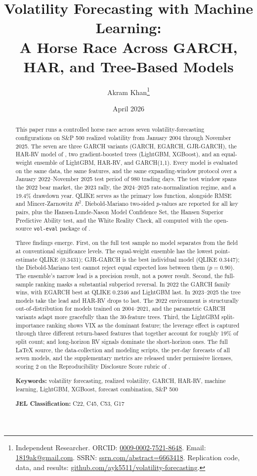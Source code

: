 \documentclass[12pt,a4paper]{article}
\title{Volatility Forecasting with Machine Learning:\\A Horse Race Across GARCH, HAR, and Tree-Based Models}
\author{
    Akram Khan\thanks{Independent Researcher. ORCID: \href{https://orcid.org/0009-0002-7521-8648}{0009-0002-7521-8648}. Email: \href{mailto:1819ak@gmail.com}{1819ak@gmail.com}. SSRN: \href{https://ssrn.com/abstract=6663418}{ssrn.com/abstract=6663418}. Replication code, data, and results: \href{https://github.com/ayk5511/volatility-forecasting}{github.com/ayk5511/volatility-forecasting}.}
}
\date{April 2026}
\begin{document}
\maketitle

\begin{abstract}
This paper runs a controlled horse race across seven volatility-forecasting configurations on S\&P 500 realized volatility from January 2004 through November 2025. The seven are three GARCH variants (GARCH, EGARCH, GJR-GARCH), the HAR-RV model of \citet{Corsi2009}, two gradient-boosted trees (LightGBM, XGBoost), and an equal-weight ensemble of LightGBM, HAR-RV, and GARCH(1,1). Every model is evaluated on the same data, the same features, and the same expanding-window protocol over a January 2022--November 2025 test period of 980 trading days. The test window spans the 2022 bear market, the 2023 rally, the 2024--2025 rate-normalization regime, and a 19.4\% drawdown year. QLIKE serves as the primary loss function, alongside RMSE and Mincer-Zarnowitz $R^2$. Diebold-Mariano two-sided $p$-values are reported for all key pairs, plus the Hansen-Lunde-Nason Model Confidence Set, the Hansen Superior Predictive Ability test, and the White Reality Check, all computed with the open-source \texttt{vol-eval} package of \citet{Khan2026VolEval}.

Three findings emerge. First, on the full test sample no model separates from the field at conventional significance levels. The equal-weight ensemble has the lowest point-estimate QLIKE (0.3431); GJR-GARCH is the best individual model (QLIKE 0.3447); the Diebold-Mariano test cannot reject equal expected loss between them ($p = 0.90$). The ensemble's narrow lead is a precision result, not a power result. Second, the full-sample ranking masks a substantial subperiod reversal. In 2022 the GARCH family wins, with EGARCH best at QLIKE 0.2346 and LightGBM last. In 2023--2025 the tree models take the lead and HAR-RV drops to last. The 2022 environment is structurally out-of-distribution for models trained on 2004--2021, and the parametric GARCH variants adapt more gracefully than the 30-feature trees. Third, the LightGBM split-importance ranking shows VIX as the dominant feature; the leverage effect is captured through three different return-based features that together account for roughly 19\% of split count; and long-horizon RV signals dominate the short-horizon ones. The full LaTeX source, the data-collection and modeling scripts, the per-day forecasts of all seven models, and the supplementary metrics are released under permissive licenses, scoring 2 on the Reproducibility Disclosure Score rubric of \citet{Khan2026}.

\medskip
\noindent\textbf{Keywords:} volatility forecasting, realized volatility, GARCH, HAR-RV, machine learning, LightGBM, XGBoost, forecast combination, S\&P 500

\medskip
\noindent\textbf{JEL Classification:} C22, C45, C53, G17
\end{abstract}
\end{document}
